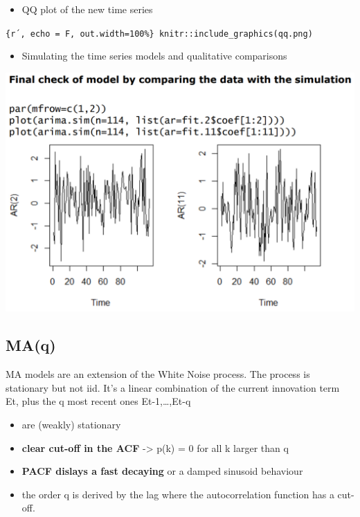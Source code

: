 \documentclass[
]{article}
\providecommand{\tightlist}{%
  \setlength{\itemsep}{0pt}\setlength{\parskip}{0pt}}
\begin{document}
\begin{itemize}
\tightlist
\item
  QQ plot of the new time series
\end{itemize}

\texttt{\{r´,\ echo\ =\ F,\ out.width=\textquotesingle{}100\%\textquotesingle{}\}\ knitr::include\_graphics(\textquotesingle{}qq.png\textquotesingle{})}

\begin{itemize}
\tightlist
\item
  Simulating the time series models and qualitative comparisons
\end{itemize}

\includegraphics[width=14.65in]{visu3}

\hypertarget{maq}{%
\subsection{MA(q)}\label{maq}}

MA models are an extension of the White Noise process. The process is
stationary but not iid. It's a linear combination of the current
innovation term Et, plus the q most recent ones Et-1,\ldots,Et-q

\begin{itemize}
\tightlist
\item
  are (weakly) stationary
\item
  \textbf{clear cut-off in the ACF} -\textgreater{} p(k) = 0 for all k
  larger than q
\item
  \textbf{PACF dislays a fast decaying} or a damped sinusoid behaviour
\item
  the order q is derived by the lag where the autocorrelation function
  has a cut-off.
\end{itemize}
\end{document}
